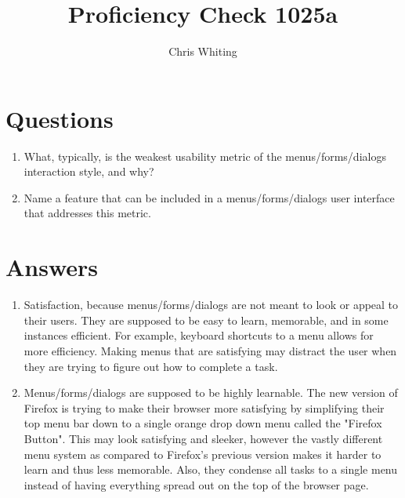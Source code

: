 \documentclass[11pt]{article}
\title{ Proficiency Check 1025a}
\author{Chris Whiting}
\begin{document}
\maketitle

 
\section*{Questions}

\begin{enumerate}
\item What, typically, is the weakest usability metric of the menus/forms/dialogs interaction style, and why?

\item Name a feature that can be included in a menus/forms/dialogs user interface that addresses this metric.
\end{enumerate}

\section*{Answers}

\begin{enumerate}
\item 
Satisfaction, because menus/forms/dialogs are not meant to look or appeal to their users. They are supposed to be easy to learn, memorable, and in some instances efficient. For example, keyboard shortcuts to a menu allows for more efficiency. Making menus that are satisfying may distract the user when they are trying to figure out how to complete a task. 

\item 
Menus/forms/dialogs are supposed to be highly learnable. The new version of Firefox is trying to make their browser more satisfying by simplifying their top menu bar down to a single orange drop down menu called the "Firefox Button". This may look satisfying and sleeker, however the vastly different menu system as compared to Firefox's previous version makes it harder to learn and thus less memorable. Also, they condense all tasks to a single menu instead of having everything spread out on the top of the browser page.
\end{enumerate}
\end{document}

